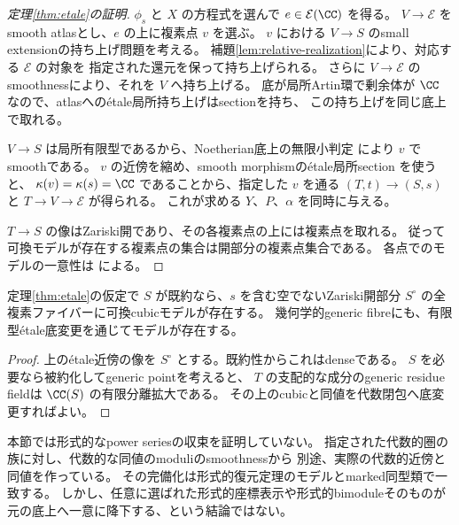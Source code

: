 \begin{proof}[定理\ref{thm:etale}の証明]
 \(\phi_s\) と \(X\) の方程式を選んで \(e\in\mathcal E(\CC)\) を得る。
 \(V\to\mathcal E\) をsmooth atlasとし、\(e\) の上に複素点 \(v\) を選ぶ。
 \(v\) における \(V\to S\) のsmall extensionの持ち上げ問題を考える。
 補題\ref{lem:relative-realization}により、対応する \(\mathcal E\) の対象を
 指定された還元を保って持ち上げられる。
 さらに \(V\to\mathcal E\) のsmoothnessにより、それを \(V\) へ持ち上げる。
 底が局所Artin環で剰余体が \(\CC\) なので、atlasへのétale局所持ち上げはsectionを持ち、
 この持ち上げを同じ底上で取れる。

 \(V\to S\) は局所有限型であるから、Noetherian底上の無限小判定
 \cite[Tag 02HX]{Stacks}により \(v\) でsmoothである。
 \(v\) の近傍を縮め、smooth morphismのétale局所section
 \cite[Tag 055Uとその証明中のLemma 37.38.5]{Stacks}を使うと、
 \(\kappa(v)=\kappa(s)=\CC\) であることから、指定した \(v\) を通る
 \((T,t)\to(S,s)\) と \(T\to V\to\mathcal E\) が得られる。
 これが求める \(Y\)、\(P\)、\(\alpha\) を同時に与える。

 \(T\to S\) の像はZariski開であり、その各複素点の上には複素点を取れる。
 従って可換モデルが存在する複素点の集合は開部分の複素点集合である。
 各点でのモデルの一意性は \cite[Theorem 1.7]{LZ} による。
\end{proof}

\begin{corollary}\label{cor:generic-realization}
 定理\ref{thm:etale}の仮定で \(S\) が既約なら、\(s\) を含む空でないZariski開部分
 \(S^\circ\) の全複素ファイバーに可換cubicモデルが存在する。
 幾何学的generic fibreにも、有限型étale底変更を通じてモデルが存在する。
\end{corollary}
\begin{proof}
 上のétale近傍の像を \(S^\circ\) とする。既約性からこれはdenseである。
 \(S\) を必要なら被約化してgeneric pointを考えると、
 \(T\) の支配的な成分のgeneric residue fieldは \(\CC(S)\) の有限分離拡大である。
 その上のcubicと同値を代数閉包へ底変更すればよい。
\end{proof}

\begin{remark}\label{rem:algebraization-boundary}
 本節では形式的なpower seriesの収束を証明していない。
 指定された代数的圏の族に対し、代数的な同値のmoduliのsmoothnessから
 別途、実際の代数的近傍と同値を作っている。
 その完備化は形式的復元定理のモデルとmarked同型類で一致する。
 しかし、任意に選ばれた形式的座標表示や形式的bimoduleそのものが
 元の底上へ一意に降下する、という結論ではない。
\end{remark}


